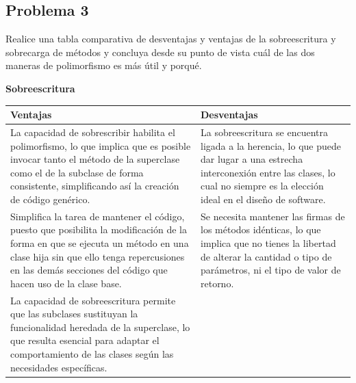 \documentclass[11pt, twocolumn]{article}
\begin{document}
  \subsection*{Problema 3}
  Realice una tabla comparativa de desventajas y ventajas de la sobreescritura y sobrecarga de métodos y concluya desde su punto de vista cuál de las dos maneras de polimorfismo es más útil y porqué.
  
  \newpage
  \textbf{Sobreescritura}
  \begin{table}[h!]
    \footnotesize	
    \begin{tabular}{|p{}|p{}|}
      \hline
      \textbf{Ventajas} & \textbf{Desventajas} \\ \hline
      La capacidad de sobrescribir habilita el polimorfismo, lo que implica que es posible invocar tanto el método de la superclase como el de la subclase de forma consistente, simplificando así la creación de código genérico. & La sobreescritura se encuentra ligada a la herencia, lo que puede dar lugar a una estrecha interconexión entre las clases, lo cual no siempre es la elección ideal en el diseño de software. \\ \hline
      
      Simplifica la tarea de mantener el código, puesto que posibilita la modificación de la forma en que se ejecuta un método en una clase hija sin que ello tenga repercusiones en las demás secciones del código que hacen uso de la clase base. & Se necesita mantener las firmas de los métodos idénticas, lo que implica que no tienes la libertad de alterar la cantidad o tipo de parámetros, ni el tipo de valor de retorno. \\ \hline
      
      La capacidad de sobreescritura permite que las subclases sustituyan la funcionalidad heredada de la superclase, lo que resulta esencial para adaptar el comportamiento de las clases según las necesidades específicas. & \\ \hline
    \end{tabular}
  \end{table}
\end{document}
